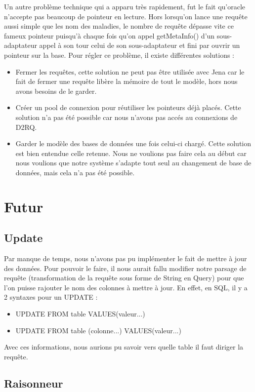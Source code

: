 \documentclass[12pt]{article}
\begin{document}
	Un autre problème technique qui a apparu très rapidement, fut le fait qu'oracle n'accepte pas beaucoup de pointeur en lecture. Hors lorsqu'on lance une requête aussi simple que les nom des maladies, le nombre de requête dépasse vite ce fameux pointeur puisqu'à chaque fois qu'on appel getMetaInfo() d'un sous-adaptateur appel à son tour celui de son sous-adaptateur et fini par ouvrir un pointeur sur la base. Pour régler ce problème, il existe différentes solutions :
\begin{itemize}
	\item Fermer les requêtes, cette solution ne peut pas être utilisée avec Jena car le fait de fermer une requête libère la mémoire de tout le modèle, hors nous avons besoins de le garder.
	\item Créer un pool de connexion pour réutiliser les pointeurs déjà placés. Cette solution n'a pas été possible car nous n'avons pas accés au connexions de D2RQ.
	\item Garder le modèle des bases de données une fois celui-ci chargé. Cette solution est bien entendue celle retenue. Nous ne voulions pas faire cela au début car nous voulions que notre système s'adapte tout seul au changement de base de données, mais cela n'a pas été possible.
\end{itemize}

\section{Futur}

\subsection{Update}

	Par manque de temps, nous n'avons pas pu implémenter le fait de mettre à jour des données. Pour pouvoir le faire, il nous aurait fallu modifier notre parsage de requête (transformation de la requête sous forme de String en Query) pour que l'on puisse rajouter le nom des colonnes à mettre à jour. En effet, en SQL, il y a 2 syntaxes pour un UPDATE :
\begin{itemize}
	\item UPDATE FROM table VALUES(valeur...)
 	\item UPDATE FROM table (colonne...) VALUES(valeur...)
 \end{itemize}
Avec ces informations, nous aurions pu savoir vers quelle table il faut diriger la requête.

\subsection{Raisonneur}
\end{document}
